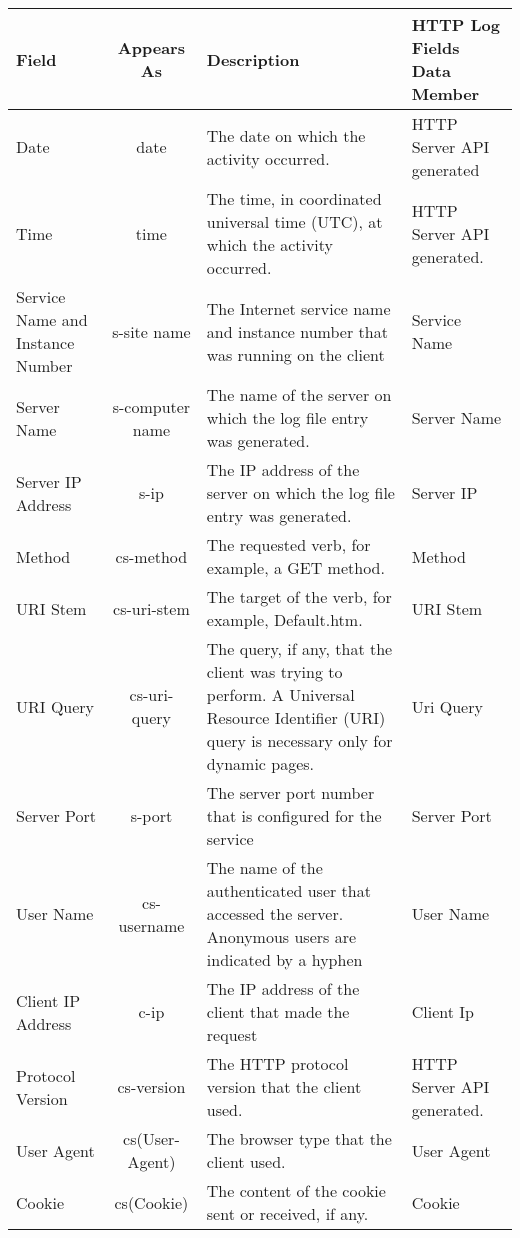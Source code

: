 \documentclass{RCPT}
\begin{document}
\begin{table}
\begin{center}
\caption{W3C File format of RCPIT Log file}\label{W3C File format of RCPIT Log file}
\begin{longtable}{ | p{2cm} | c | p{5cm} | p{4cm} |}
\hline
{\bf Field} & {\bf Appears As} & {\bf Description} & {\bf HTTP Log Fields Data Member} \\
\hline
\hline
Date & date & The date on which the activity occurred. & HTTP Server API generated \\  \hline
Time & time &The time, in coordinated universal time (UTC), at which the activity occurred.  & HTTP Server API generated. \\  \hline
Service Name and Instance Number & s-site name & The Internet service name and instance number that was running on the client & Service Name \\  \hline
Server Name  & s-computer name & The name of the server on which the log file entry was generated.  & Server Name \\  \hline
Server IP Address  & s-ip & The IP address of the server on which the log file entry was generated. & Server IP \\  \hline
 Method & cs-method & The requested verb, for example, a GET method. & Method \\  \hline
 URI Stem & cs-uri-stem & The target of the verb, for example, Default.htm. & URI Stem \\  \hline
 URI Query & cs-uri-query & The query, if any, that the client was trying to perform. A Universal Resource Identifier (URI) query is necessary only for dynamic pages.  & Uri Query \\  \hline
 Server Port& s-port & The server port number that is configured for the service & Server Port \\
\hline
User Name & cs-username & The name of the authenticated user that accessed the server. Anonymous users are indicated by a hyphen & User Name\\
\hline
Client IP Address & c-ip & The IP address of the client that made the request & Client Ip\\ \hline
 Protocol Version& cs-version & The HTTP protocol version that the client used. & HTTP Server API generated. \\  \hline
User Agent & cs(User-Agent) & The browser type that the client used. & User Agent \\  \hline
Cookie & cs(Cookie) & The content of the cookie sent or received, if any. & Cookie \\  \hline \hline
\end{longtable}
\end{center}
\end{table}
\end{document}
